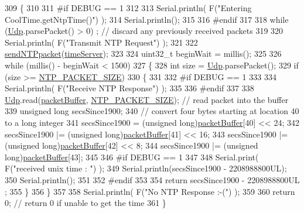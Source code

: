 \begin{DoxyCode}
309 \{
310 
311 \textcolor{preprocessor}{#if DEBUG == 1 }
312 
313     Serial.println( F(\textcolor{stringliteral}{"Entering CoolTime.getNtpTime()"}) );
314     Serial.println();
315 
316 \textcolor{preprocessor}{#endif }
317 
318     \textcolor{keywordflow}{while} (\hyperlink{class_cool_time_a4e23216a8121ca79d0fb019f30884b92}{Udp}.parsePacket() > 0) ; \textcolor{comment}{// discard any previously received packets}
319 
320     Serial.println( F(\textcolor{stringliteral}{"Transmit NTP Request"}) );
321 
322     \hyperlink{class_cool_time_a236a38d120dc53bc67456d763838c5a1}{sendNTPpacket}(\hyperlink{class_cool_time_ad2b9858f399108cb440dd1e908916f04}{timeServer});
323 
324     uint32\_t beginWait = millis();
325 
326     \textcolor{keywordflow}{while} (millis() - beginWait < 1500) 
327     \{
328         \textcolor{keywordtype}{int} size = \hyperlink{class_cool_time_a4e23216a8121ca79d0fb019f30884b92}{Udp}.parsePacket();
329         \textcolor{keywordflow}{if} (size >= \hyperlink{_cool_time_8h_a56a6ea64006651b4f42adf713e244f06}{NTP\_PACKET\_SIZE}) 
330         \{
331         
332 \textcolor{preprocessor}{        #if DEBUG == 1}
333 
334             Serial.println( F(\textcolor{stringliteral}{"Receive NTP Response"}) );
335         
336 \textcolor{preprocessor}{        #endif}
337 
338             \hyperlink{class_cool_time_a4e23216a8121ca79d0fb019f30884b92}{Udp}.read(\hyperlink{class_cool_time_a27e6abc82a5c2f72161956967005bec7}{packetBuffer}, \hyperlink{_cool_time_8h_a56a6ea64006651b4f42adf713e244f06}{NTP\_PACKET\_SIZE});  \textcolor{comment}{// read packet into the
       buffer}
339             \textcolor{keywordtype}{unsigned} \textcolor{keywordtype}{long} secsSince1900;
340             \textcolor{comment}{// convert four bytes starting at location 40 to a long integer}
341             secsSince1900 =  (\textcolor{keywordtype}{unsigned} long)\hyperlink{class_cool_time_a27e6abc82a5c2f72161956967005bec7}{packetBuffer}[40] << 24;
342             secsSince1900 |= (\textcolor{keywordtype}{unsigned} long)\hyperlink{class_cool_time_a27e6abc82a5c2f72161956967005bec7}{packetBuffer}[41] << 16;
343             secsSince1900 |= (\textcolor{keywordtype}{unsigned} long)\hyperlink{class_cool_time_a27e6abc82a5c2f72161956967005bec7}{packetBuffer}[42] << 8;
344             secsSince1900 |= (\textcolor{keywordtype}{unsigned} long)\hyperlink{class_cool_time_a27e6abc82a5c2f72161956967005bec7}{packetBuffer}[43];
345         
346 \textcolor{preprocessor}{        #if DEBUG == 1 }
347     
348             Serial.print( F(\textcolor{stringliteral}{"received unix time : "}) );
349             Serial.println(secsSince1900 - 2208988800UL);
350             Serial.println();
351 
352 \textcolor{preprocessor}{        #endif }
353 
354             \textcolor{keywordflow}{return} secsSince1900 - 2208988800UL ;
355         \}
356     \}
357     
358     Serial.println( F(\textcolor{stringliteral}{"No NTP Response :-("}) );
359 
360     \textcolor{keywordflow}{return} 0; \textcolor{comment}{// return 0 if unable to get the time}
361 \}
\end{DoxyCode}
